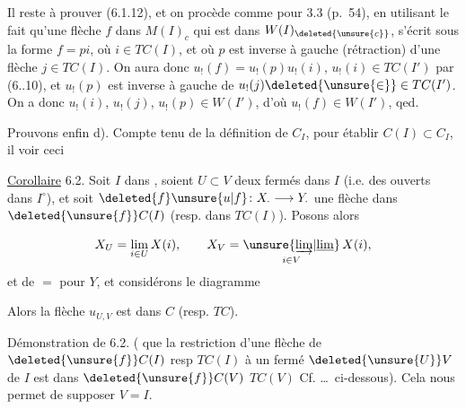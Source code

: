 Il reste à prouver (6.1.12), et on procède
comme pour 3.3 (p.~54), en utilisant
le fait qu'une flèche $f$ dans $M(I)_c$
qui est dans $W(I)_{\deleted{\unsure{c}}}$, s'écrit  sous la
forme $f=pi$, où $i\in TC(I)$, et
où $p$ est  inverse à gauche (rétraction)
d'une flèche $j\in TC(I)$. On aura
donc $u_!(f)=u_!(p)u_!(i)$,  $u_!(i)\in TC(I')$
par (6..10), et $u_!(p)$ est inverse à
gauche de $u_!(j)\deleted{\unsure{\in}} \in TC(I')$. On a
donc $u_!(i)$, $u_!(j)$, $u_!(p)\in W(I')$, d'où
$u_!(f)\in W(I')$, qed.

Prouvons enfin d).  Compte
tenu de la définition de $C_I$, pour
établir $C(I)\subset C_I$, il  
voir ceci

\uline{Corollaire} 6.2. Soit $I$  dans ,
soient $U\subset V$ deux fermés dans $I$
(i.e. des ouverts dans $I^\circ$), et 
soit $\deleted{f}\unsure{u|f}\colon X_\cdot\longrightarrow Y_\cdot$ une flèche
dans $\deleted{\unsure{f}}C(I)$ (resp. dans $TC(I)$).
 Posons alors

\[
 X_U=\lim_{i\in U}X(i),\qquad X_V=\underset{i\in V}{\unsure{\underrightarrow{\lim}|\underline{\lim}}}\,X(i),
\]
et de $=$ pour $Y$, et considérons le
diagramme


Alors la flèche $u_{U,V}$ est dans $C$ (resp. $TC$).

Démonstration de 6.2. ( 
que la restriction d'une flèche de
$\deleted{\unsure{f}} C(I)$ resp $TC(I)$ à un fermé
 $\deleted{\unsure{U}}V$ de $I$  est dans $\deleted{\unsure{f}} C(V)$ 
$TC(V)$ Cf. \ldots\ ci-dessous). Cela
nous permet de supposer $V=I$.


